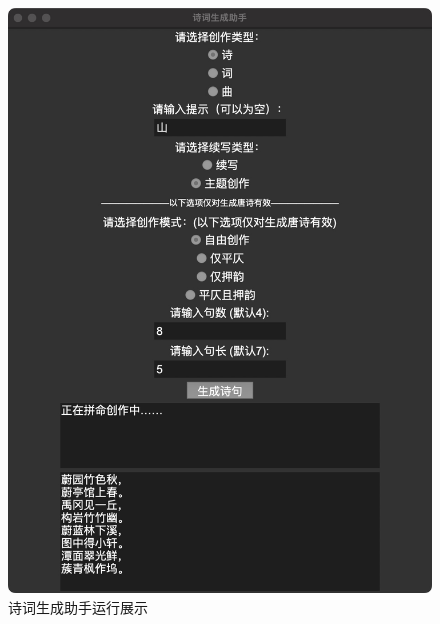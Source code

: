 \begin{figure}[h]
\begin{minipage}[b]{0.49\textwidth}
        \includegraphics[width=\textwidth]{img/writer/结果1.jpg}
        \caption{诗词生成助手运行展示}
        \label{fig:poem_generator_demo}
    \end{minipage}
\end{figure}
